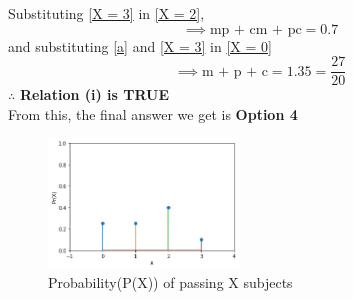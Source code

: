 \documentclass[journal,12pt,twocolumn]{IEEEtran}
\begin{document}
Substituting \eqref{X = 3} in \eqref{X = 2},
\begin{equation}
    \tag{1.8}
    \implies \text{mp + cm + pc} = 0.7 \label{a}
\end{equation}
and substituting \eqref{a} and \eqref{X = 3} in \eqref{X = 0}
\begin{equation}
    \tag{1.9}
    \implies \text{m + p + c} = 1.35 = \frac{27}{20}
\end{equation}
$\therefore$ \textbf{Relation (i) is TRUE} \\
From this, the final answer we get is \textbf{Option 4}
\begin{figure}[!htb]
\centering
\includegraphics[width=0.45\textwidth]{Assignment 4.png}
\caption{Probability(P(X)) of passing X subjects}
\end{figure}
\end{document}
